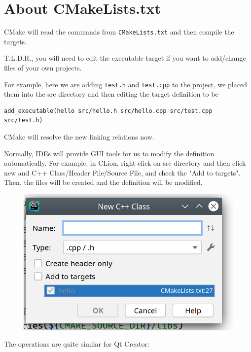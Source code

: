 \documentclass[a4paper,12pt]{report}
\begin{document}
\chapter{About CMakeLists.txt}
CMake will read the commands from \texttt{CMakeLists.txt} and then compile the targets.

T.L.D.R., you will need to edit the executable target if you want to add/change files of your own projects.

For example, here we are adding \texttt{test.h} and \texttt{test.cpp} to the project, we placed them into the src directory and then editing the target definition to be
\begin{verbatim}
add_executable(hello src/hello.h src/hello.cpp src/test.cpp src/test.h)
\end{verbatim}
CMake will resolve the new linking relations now.

Normally, IDEs will provide GUI tools for us to modify the definition automatically. For example, in CLion, right click on src directory and then click new and C++ Class/Header File/Source File,  and check the "Add to targets". Then, the files will be created and the definition will be modified.

\begin{figure}[H] 
	\centering
	\includegraphics[width=\linewidth]{clion_auto}
\end{figure}
 
The operations are quite similar for Qt Creator:
\end{document}
